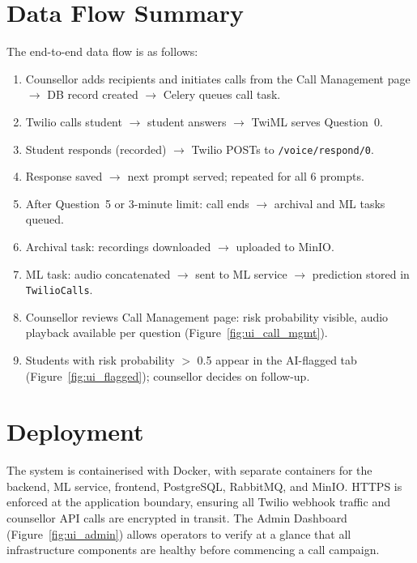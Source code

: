 \section{Data Flow Summary}

The end-to-end data flow is as follows:
\begin{enumerate}
    \item Counsellor adds recipients and initiates calls from the Call Management page $\rightarrow$ DB record created $\rightarrow$ Celery queues call task.
    \item Twilio calls student $\rightarrow$ student answers $\rightarrow$ TwiML serves Question~0.
    \item Student responds (recorded) $\rightarrow$ Twilio POSTs to \texttt{/voice/respond/0}.
    \item Response saved $\rightarrow$ next prompt served; repeated for all 6 prompts.
    \item After Question~5 or 3-minute limit: call ends $\rightarrow$ archival and ML tasks queued.
    \item Archival task: recordings downloaded $\rightarrow$ uploaded to MinIO.
    \item ML task: audio concatenated $\rightarrow$ sent to ML service $\rightarrow$ prediction stored in \texttt{TwilioCalls}.
    \item Counsellor reviews Call Management page: risk probability visible, audio playback available per question (Figure~\ref{fig:ui_call_mgmt}).
    \item Students with risk probability $>$ 0.5 appear in the AI-flagged tab (Figure~\ref{fig:ui_flagged}); counsellor decides on follow-up.
\end{enumerate}

\section{Deployment}

The system is containerised with Docker, with separate containers for the backend, ML service, frontend, PostgreSQL, RabbitMQ, and MinIO. HTTPS is enforced at the application boundary, ensuring all Twilio webhook traffic and counsellor API calls are encrypted in transit. The Admin Dashboard (Figure~\ref{fig:ui_admin}) allows operators to verify at a glance that all infrastructure components are healthy before commencing a call campaign.

